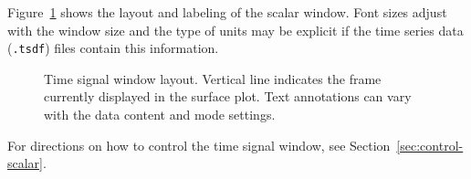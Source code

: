 Figure~\ref{fig:scalar} shows the layout and labeling of the scalar
window.  Font sizes adjust with the window size and the type of units may
be explicit if the time series data (\texttt{.tsdf}) files contain this
information. 

\begin{figure}[htb]
  \begin{makeimage}
  \end{makeimage}
  \timesignal
  \caption{\label{fig:scalar} Time signal window layout.  Vertical line
  indicates the frame currently displayed in the surface plot.   Text
  annotations can vary with the data content and mode settings.}
\end{figure}

For directions on how to control the time signal window, see
Section~\ref{sec:control-scalar}. 



